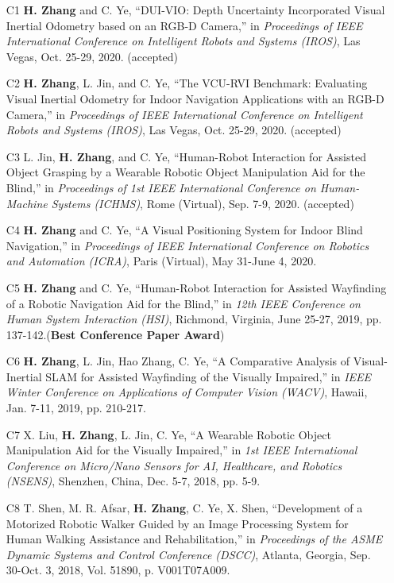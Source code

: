 \begin{justify}
	\begin{itemize}[before=\fontsize{9pt}{1em}\bodyfontlight\upshape\color{text},leftmargin=3ex, nosep, noitemsep]
		\setlength{\parskip}{0pt}
		\renewcommand{\labelitemi}{\bullet}
		\item[C1]{\textbf{H. Zhang} and C. Ye, “DUI-VIO: Depth Uncertainty Incorporated Visual Inertial Odometry based on an RGB-D Camera,” in \emph{Proceedings of IEEE International Conference on Intelligent Robots and Systems (IROS)}, Las Vegas, Oct. 25-29, 2020. (accepted)}
		\item[C2]{\textbf{H. Zhang}, L. Jin, and C. Ye, “The VCU-RVI Benchmark: Evaluating Visual Inertial Odometry for Indoor Navigation Applications with an RGB-D Camera,” in \emph{Proceedings of IEEE International Conference on Intelligent Robots and Systems (IROS)}, Las Vegas, Oct. 25-29, 2020. (accepted)}	
		\item[C3]{L. Jin, \textbf{H. Zhang}, and C. Ye, “Human-Robot Interaction for Assisted Object Grasping by a Wearable Robotic Object Manipulation Aid for the Blind,” in \emph{Proceedings of 1st IEEE International Conference on Human-Machine Systems (ICHMS)}, Rome (Virtual), Sep. 7-9, 2020. (accepted)}
		\item[C4]{\textbf{H. Zhang} and C. Ye, “A Visual Positioning System for Indoor Blind Navigation,” in \emph{Proceedings of IEEE International Conference on Robotics and Automation (ICRA)}, Paris (Virtual), May 31-June 4, 2020.}
		\item[C5]{\textbf{H. Zhang} and C. Ye, “Human-Robot Interaction for Assisted Wayfinding of a Robotic Navigation Aid for the Blind,” in \emph{12th IEEE Conference on Human System Interaction (HSI)}, Richmond, Virginia, June 25-27, 2019, pp. 137-142.(\textbf{Best Conference Paper Award})}
		\item[C6]{\textbf{H. Zhang}, L. Jin, Hao Zhang, C. Ye, “A Comparative Analysis of Visual-Inertial SLAM for Assisted Wayfinding of the Visually Impaired,” in \emph{IEEE Winter Conference on Applications of Computer Vision (WACV)}, Hawaii, Jan. 7-11, 2019, pp. 210-217.}
		\item[C7]{X. Liu, \textbf{H. Zhang}, L. Jin, C. Ye,  “A Wearable Robotic Object Manipulation Aid for the Visually Impaired,” in \emph{1st IEEE International Conference on Micro/Nano Sensors for AI, Healthcare, and Robotics (NSENS)}, Shenzhen, China, Dec. 5-7, 2018, pp. 5-9.}
		\item[C8]{T. Shen, M. R. Afsar, \textbf{H. Zhang}, C. Ye, X. Shen, “Development of a Motorized Robotic Walker Guided by an Image Processing System for Human Walking Assistance and Rehabilitation,” in \emph{Proceedings of the ASME Dynamic Systems and Control Conference (DSCC)}, Atlanta, Georgia, Sep. 30-Oct. 3, 2018, Vol. 51890, p. V001T07A009.}

\end{itemize}
\end{justify}
